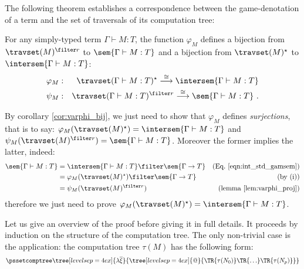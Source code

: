 The following theorem establishes a correspondence between the
game-denotation of a term and the set of traversals of its
computation tree:
\begin{theorem}
\label{thm:correspondence}
 For any simply-typed term $\Gamma \vdash M :T$,
the function $\varphi_M$ defines a bijection from $\travset(M)^{\filter
r}$ to $\sem{\Gamma \vdash M : T}$ and a bijection from
$\travset(M)^\star$ to $\intersem{\Gamma \vdash M : T}$:
\begin{eqnarray*}
 \varphi_M  &:& \travset(\Gamma \vdash M : T)^\star \stackrel{\cong}{\longrightarrow} \intersem{\Gamma \vdash M :T} \\
 \psi_M  &:& \travset(\Gamma \vdash M : T)^{\filter r} \stackrel{\cong}{\longrightarrow} \sem{\Gamma \vdash M :T} \ .
\end{eqnarray*}

\end{theorem}

\begin{remark}
\label{rem:corresp_proofreduction}
    By corollary \ref{cor:varphi_bij}, we just need to show that
    $\varphi_M$ defines \emph{surjections}, that is to
    say: $\varphi_M(\travset(M)^\star) = \intersem{\Gamma \vdash M : T}$
    and $\psi_M(\travset(M)^{\filter r}) = \sem{\Gamma \vdash M : T}$.
    Moreover the former implies the latter, indeed:
    \begin{align*}
    \sem{\Gamma \vdash M : T} &= \intersem{\Gamma \vdash M : T} \filter \sem{\Gamma \rightarrow T} & \mbox{(Eq.\ \ref{eqn:int_std_gamsem})} \\
            &= \varphi_M(\travset(M)^\star) \filter \sem{\Gamma \rightarrow T} & \mbox{(by (i))}\\
            &= \psi_M(\travset(M)^{\filter r}) & \mbox{(lemma \ref{lem:varphi_proj})}
    \end{align*}
    therefore we just need to prove $\varphi_M(\travset(M)^\star) = \intersem{\Gamma \vdash M : T}$.
\end{remark}
\smallskip

    Let us give an overview of the proof before giving it in full details.
    It proceeds by induction on the structure of the computation tree.
    The only non-trivial case is the application: the computation tree
    $\tau(M)$ has the following form:
        $$ \pssetcomptree\tree[levelsep=4ex]{\lambda \overline{\xi}}
            { \tree[levelsep=4ex]{@}
                {   \TR{\tau(N_0)} \TR{\ldots} \TR{\tau(N_p)}}}
        $$

